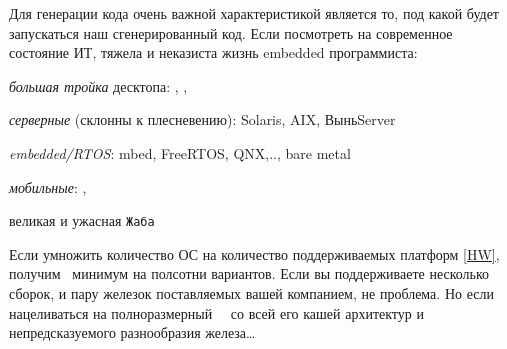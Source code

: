 \clearpage
{}\label{os}\secdown

Для генерации кода очень важной характеристикой является то, под какой 
будет запускаться наш сгенерированный код. Если посмотреть на современное состояние ИТ, 
тяжела и неказиста жизнь embedded программиста: 
\begin{description}%
    \item{\emph{большая тройка} десктопа}: \win, \linux, \macos
    \item{\emph{серверные} (склонны к плесневению)}: Solaris, AIX, ВыньServer
    \item{\emph{embedded/RTOS}}: mbed, FreeRTOS, QNX,.., bare metal
    \item{\emph{мобильные}}: \ios, \andr
    \item{великая и ужасная} \texttt{Жаба}
\end{description}

\clearpage
Если умножить количество ОС на количество поддерживаемых платформ \ref{HW}, получим \ минимум на полсотни вариантов. Если вы поддерживаете несколько сборок, и пару железок поставляемых вашей компанием, не проблема. Но если
нацеливаться на полноразмерный \ \iot\ со всей его кашей архитектур и непредсказуемого разнообразия железа\ldots





\secup
